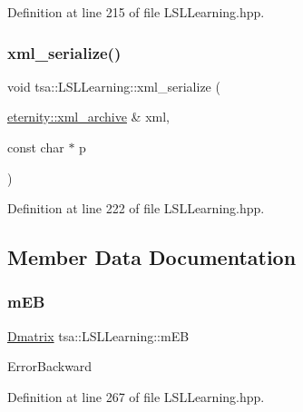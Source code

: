 Definition at line 215 of file L\+S\+L\+Learning.\+hpp.

\mbox{\label{classtsa_1_1_l_s_l_learning_a54c30966b4ddf0327ef5f4b9a8b774f1}} 
\subsubsection{\texorpdfstring{xml\+\_\+serialize()}{xml\_serialize()}}
{\footnotesize\ttfamily void tsa\+::\+L\+S\+L\+Learning\+::xml\+\_\+serialize (\begin{DoxyParamCaption}\item[{\hyperlink{classeternity_1_1xml__archive}{eternity\+::xml\+\_\+archive} \&}]{xml,  }\item[{const char $\ast$}]{p }\end{DoxyParamCaption})\hspace{0.3cm}{\ttfamily [inline]}}



Definition at line 222 of file L\+S\+L\+Learning.\+hpp.



\subsection{Member Data Documentation}
\mbox{\label{classtsa_1_1_l_s_l_learning_aee8f5369206276f3a7faaaaa048485fb}} 
\subsubsection{\texorpdfstring{m\+EB}{mEB}}
{\footnotesize\ttfamily \hyperlink{namespacetsa_ad260cd21c1891c4ed391fe788569aba4}{Dmatrix} tsa\+::\+L\+S\+L\+Learning\+::m\+EB\hspace{0.3cm}{\ttfamily [private]}}

Error\+Backward 

Definition at line 267 of file L\+S\+L\+Learning.\+hpp.

\mbox{\label{classtsa_1_1_l_s_l_learning_abc6dbb01c7f1a1b4c1d6ee5cb6ba14e8}} 
